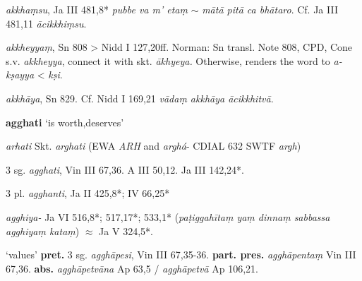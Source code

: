 \documentclass[11pt]{article}
\newcommand*\ṛ{r\symbol{"325}}
\newcommand*\Ṛ{R\symbol{"325}}
\newcommand*\ṝ{r\symbol{"304}\symbol{"325}}
\newcommand*\Ṝ{R\symbol{"304}\symbol{"325}}
\newcommand*\ḷ{l\symbol{"325}}
\newcommand*\ḹ{l\symbol{"304}\symbol{"325}}
\newcommand*\Ḷ{L\symbol{"325}}
\newcommand*\Ḹ{L\symbol{"304}\symbol{"325}}
\begin{document}
\textit{akkhaṃsu}, Ja III 481,8* \textit{pubbe va m' etaṃ} $\sim$ \textit{mātā pitā ca bhātaro}.
Cf. Ja III 481,11 \textit{ācikkhiṃsu}.

\textit{akkheyyaṃ}, Sn 808 > Nidd I 127,20ff.
Norman: Sn transl. Note 808, CPD, Cone s.v. \textit{akkheyya}, connect it with skt. \textit{ākhyeya.}
Otherwise, \citet[54]{Jayawickrama:1978} renders the word to \textit{a-kṣayya} < \textit{kṣi}.


\textit{akkhāya}, Sn 829.
Cf. Nidd I 169,21 \textit{vādaṃ akkhāya ācikkhitvā}.







%
%
\begin{center}
{\Large
\textbf{agghati} `is worth,deserves'
}
\end{center}

\begin{description}[leftmargin=\parindent]
\item[ety.]
\textit{arhati}
Skt. \textit{arghati}
(EWA  \textit{ARH}
and
\textit{arghá}-%
CDIAL 632
SWTF \textit{argh})
\end{description}


\begin{description}[leftmargin=\parindent]
\item[pres.]
3 sg. \textit{agghati},
Vin III 67,36. A III 50,12. Ja III 142,24*.

3 pl. \textit{agghanti},
Ja II 425,8*; IV 66,25*

\item[ger.]
\textit{agghiya-}
Ja VI 516,8*; 517,17*; 533,1*
(\textit{paṭiggahītaṃ yaṃ dinnaṃ sabbassa agghiyaṃ kataṃ})
$\approx$ Ja V 324,5*.
\end{description}


\begin{description}[leftmargin=\parindent]
\item[caus.] `values' \textbf{pret.} 3 sg. \textit{agghāpesi}, Vin III 67,35-36.
\textbf{part. pres.} \textit{agghāpentaṃ} Vin III 67,36.
\textbf{abs.} \textit{agghāpetvāna} Ap 63,5 / \textit{agghāpetvā} Ap 106,21.
\end{description}
\end{document}
